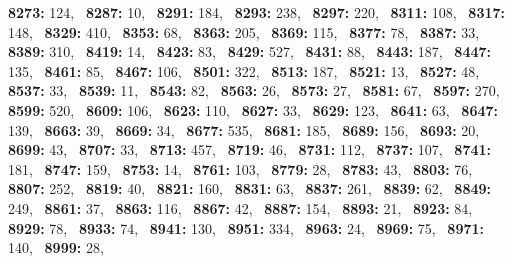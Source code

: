 \textbf{8273:} 124,\allowbreak~ 
\textbf{8287:} 10,\allowbreak~ 
\textbf{8291:} 184,\allowbreak~ 
\textbf{8293:} 238,\allowbreak~ 
\textbf{8297:} 220,\allowbreak~ 
\textbf{8311:} 108,\allowbreak~ 
\textbf{8317:} 148,\allowbreak~ 
\textbf{8329:} 410,\allowbreak~ 
\textbf{8353:} 68,\allowbreak~ 
\textbf{8363:} 205,\allowbreak~ 
\textbf{8369:} 115,\allowbreak~ 
\textbf{8377:} 78,\allowbreak~ 
\textbf{8387:} 33,\allowbreak~ 
\textbf{8389:} 310,\allowbreak~ 
\textbf{8419:} 14,\allowbreak~ 
\textbf{8423:} 83,\allowbreak~ 
\textbf{8429:} 527,\allowbreak~ 
\textbf{8431:} 88,\allowbreak~ 
\textbf{8443:} 187,\allowbreak~ 
\textbf{8447:} 135,\allowbreak~ 
\textbf{8461:} 85,\allowbreak~ 
\textbf{8467:} 106,\allowbreak~ 
\textbf{8501:} 322,\allowbreak~ 
\textbf{8513:} 187,\allowbreak~ 
\textbf{8521:} 13,\allowbreak~ 
\textbf{8527:} 48,\allowbreak~ 
\textbf{8537:} 33,\allowbreak~ 
\textbf{8539:} 11,\allowbreak~ 
\textbf{8543:} 82,\allowbreak~ 
\textbf{8563:} 26,\allowbreak~ 
\textbf{8573:} 27,\allowbreak~ 
\textbf{8581:} 67,\allowbreak~ 
\textbf{8597:} 270,\allowbreak~ 
\textbf{8599:} 520,\allowbreak~ 
\textbf{8609:} 106,\allowbreak~ 
\textbf{8623:} 110,\allowbreak~ 
\textbf{8627:} 33,\allowbreak~ 
\textbf{8629:} 123,\allowbreak~ 
\textbf{8641:} 63,\allowbreak~ 
\textbf{8647:} 139,\allowbreak~ 
\textbf{8663:} 39,\allowbreak~ 
\textbf{8669:} 34,\allowbreak~ 
\textbf{8677:} 535,\allowbreak~ 
\textbf{8681:} 185,\allowbreak~ 
\textbf{8689:} 156,\allowbreak~ 
\textbf{8693:} 20,\allowbreak~ 
\textbf{8699:} 43,\allowbreak~ 
\textbf{8707:} 33,\allowbreak~ 
\textbf{8713:} 457,\allowbreak~ 
\textbf{8719:} 46,\allowbreak~ 
\textbf{8731:} 112,\allowbreak~ 
\textbf{8737:} 107,\allowbreak~ 
\textbf{8741:} 181,\allowbreak~ 
\textbf{8747:} 159,\allowbreak~ 
\textbf{8753:} 14,\allowbreak~ 
\textbf{8761:} 103,\allowbreak~ 
\textbf{8779:} 28,\allowbreak~ 
\textbf{8783:} 43,\allowbreak~ 
\textbf{8803:} 76,\allowbreak~ 
\textbf{8807:} 252,\allowbreak~ 
\textbf{8819:} 40,\allowbreak~ 
\textbf{8821:} 160,\allowbreak~ 
\textbf{8831:} 63,\allowbreak~ 
\textbf{8837:} 261,\allowbreak~ 
\textbf{8839:} 62,\allowbreak~ 
\textbf{8849:} 249,\allowbreak~ 
\textbf{8861:} 37,\allowbreak~ 
\textbf{8863:} 116,\allowbreak~ 
\textbf{8867:} 42,\allowbreak~ 
\textbf{8887:} 154,\allowbreak~ 
\textbf{8893:} 21,\allowbreak~ 
\textbf{8923:} 84,\allowbreak~ 
\textbf{8929:} 78,\allowbreak~ 
\textbf{8933:} 74,\allowbreak~ 
\textbf{8941:} 130,\allowbreak~ 
\textbf{8951:} 334,\allowbreak~ 
\textbf{8963:} 24,\allowbreak~ 
\textbf{8969:} 75,\allowbreak~ 
\textbf{8971:} 140,\allowbreak~ 
\textbf{8999:} 28,\allowbreak~ 
